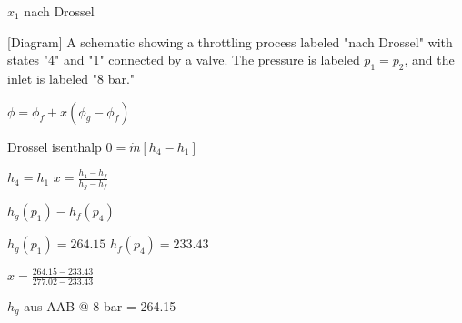 \( x_1 \) nach Drossel  

[Diagram]  
A schematic showing a throttling process labeled "nach Drossel" with states "4" and "1" connected by a valve. The pressure is labeled \( p_1 = p_2 \), and the inlet is labeled "8 bar."  

\( \phi = \phi_f + x(\phi_g - \phi_f) \)  

Drossel isenthalp  
\( 0 = \dot{m}[h_4 - h_1] \)  

\( h_4 = h_1 \)  
\( x = \frac{h_4 - h_f}{h_g - h_f} \)  

\( h_g(p_1) - h_f(p_4) \)  

\( h_g(p_1) = 264.15 \)  
\( h_f(p_4) = 233.43 \)  

\( x = \frac{264.15 - 233.43}{277.02 - 233.43} \)  

\( h_g \) aus AAB @ 8 bar = 264.15